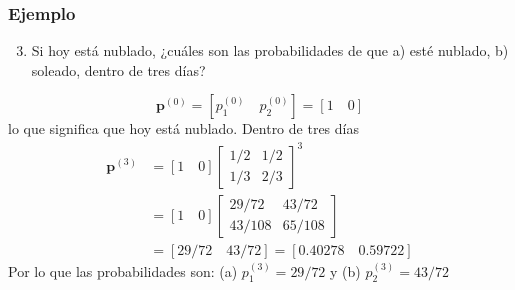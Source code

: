 \documentclass[spanish]{beamer}
\begin{document}
\begin{frame}
\frametitle{Ejemplo}
\begin{enumerate}
\setcounter{enumi}{2}
\item Si hoy está nublado, ¿cuáles son las probabilidades de que a) esté nublado, b) soleado, dentro de tres días?
\end{enumerate}

\begin{equation*}
\textbf{p}^{(0)}=\left[ p_{1}^{(0)} \quad p_{2}^{(0)}\right] =\left[ 1 \quad  0 \right]  
\end{equation*}
lo que significa que hoy está nublado. Dentro de tres días
\small
\begin{align*} 
\textbf{p}^{(3)}  & = \left[ 1 \quad  0 \right] {\begin{bmatrix} 1/2 & 1/2 \\ 1/3 & 2/3   \end{bmatrix}} ^3\\
& =\left[ 1 \quad  0 \right] {\begin{bmatrix} 29/72 & 43/72 \\ 43/108 & 65/108  \end{bmatrix}} \\
& =\left[ 29/72 \quad  43/72 \right] = \left[ 0.40278 \quad  0.59722 \right]
\end{align*}
Por lo que las probabilidades son: (a) $p_{1}^{(3)}= 29/72$ y (b) $p_{2}^{(3)}=43/72$ 
\end{frame}



\end{document}
